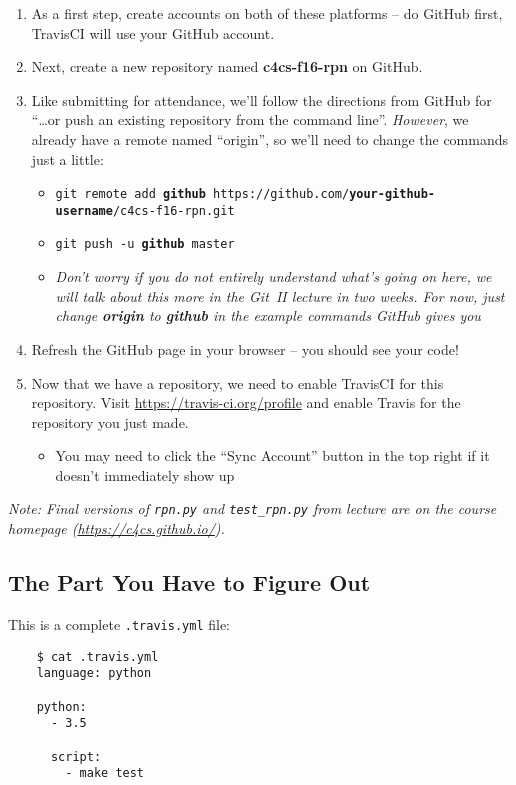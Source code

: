 \documentclass{article}
\begin{document}
\begin{enumerate}
  \item As a first step, create accounts on both of these platforms -- do
    GitHub first, TravisCI will use your GitHub account.
  \item Next, create a new repository named \textbf{c4cs-f16-rpn} on GitHub.
  \item Like submitting for attendance, we'll follow the directions from
    GitHub for ``\dots{}or push an existing repository from the command
    line''. \emph{However}, we already have a remote named ``origin'', so
    we'll need to change the commands just a little:
    \begin{itemize}
      \item \texttt{git remote add \textbf{github} https://github.com/\textbf{your-github-username}/c4cs-f16-rpn.git}
      \item \texttt{git push -u \textbf{github} master}
      \item \emph{Don't worry if you do not entirely understand what's going
          on here, we will talk about this more in the Git~II lecture in two
          weeks. For now, just change \textbf{origin} to \textbf{github} in
          the example commands GitHub gives you}
    \end{itemize}
  \item Refresh the GitHub page in your browser -- you should see your code!
  \item Now that we have a repository, we need to enable TravisCI for this
    repository. Visit \url{https://travis-ci.org/profile} and enable Travis
    for the repository you just made.
    \begin{itemize}
      \item You may need to click the ``Sync Account'' button in the top
        right if it doesn't immediately show up
    \end{itemize}
\end{enumerate}

\emph{Note: Final versions of \texttt{rpn.py} and \texttt{test\_rpn.py} from
  lecture are on the course homepage (\url{https://c4cs.github.io/}).}

\newpage

\subsection{The Part You Have to Figure Out}

{\color{violet}
  This is a complete \texttt{.travis.yml} file:

  \begin{lstlisting}
    $ cat .travis.yml
    language: python

    python:
      - 3.5

      script:
        - make test
  \end{lstlisting}
}
\end{document}
